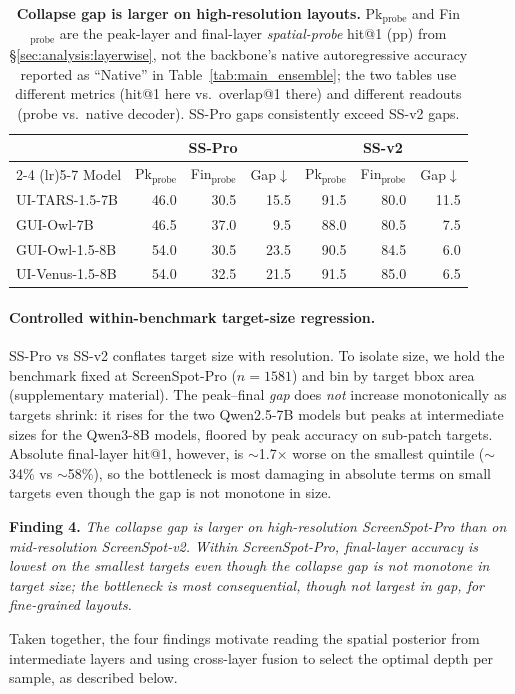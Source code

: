 \begin{table}[t]
\centering
\small
\setlength{\tabcolsep}{4pt}
\begin{tabular}{lrrr@{\hspace{0.8em}}rrr}
\toprule
& \multicolumn{3}{c}{SS-Pro} & \multicolumn{3}{c}{SS-v2} \\
\cmidrule(lr){2-4} \cmidrule(lr){5-7}
Model & Pk$_{\text{probe}}$ & Fin$_{\text{probe}}$ & Gap$\downarrow$ & Pk$_{\text{probe}}$ & Fin$_{\text{probe}}$ & Gap$\downarrow$ \\
\midrule
UI-TARS-1.5-7B & 46.0 & 30.5 & 15.5 & 91.5 & 80.0 & 11.5 \\
GUI-Owl-7B & 46.5 & 37.0 & 9.5 & 88.0 & 80.5 & 7.5 \\
GUI-Owl-1.5-8B & 54.0 & 30.5 & 23.5 & 90.5 & 84.5 & 6.0 \\
UI-Venus-1.5-8B & 54.0 & 32.5 & 21.5 & 91.5 & 85.0 & 6.5 \\
\bottomrule
\end{tabular}
\caption{
 \textbf{Collapse gap is larger on high-resolution layouts.}
 Pk$_{\text{probe}}$ and Fin$_{\text{probe}}$ are the peak-layer and final-layer \emph{spatial-probe} hit@1 (pp) from \S\ref{sec:analysis:layerwise}, not the backbone's native autoregressive accuracy reported as ``Native'' in Table~\ref{tab:main_ensemble}; the two tables use different metrics (hit@1 here vs.\ overlap@1 there) and different readouts (probe vs.\ native decoder).
 SS-Pro gaps consistently exceed SS-v2 gaps.
}
\label{tab:resolution_comparison}
\end{table}

\paragraph{Controlled within-benchmark target-size regression.}
SS-Pro vs SS-v2 conflates target size with resolution. To isolate size, we hold the benchmark fixed at ScreenSpot-Pro ($n{=}1581$) and bin by target bbox area (supplementary material). The peak--final \emph{gap} does \emph{not} increase monotonically as targets shrink: it rises for the two Qwen2.5-7B models but peaks at intermediate sizes for the Qwen3-8B models, floored by peak accuracy on sub-patch targets. Absolute final-layer hit@1, however, is $\sim$1.7$\times$ worse on the smallest quintile ($\sim$34\% vs $\sim$58\%), so the bottleneck is most damaging in absolute terms on small targets even though the gap is not monotone in size.

\begin{tcolorbox}[colback=gray!8, colframe=gray!40, boxrule=0.4pt, arc=2pt, left=4pt, right=4pt, top=3pt, bottom=3pt]
\textbf{Finding 4.}
\emph{The collapse gap is larger on high-resolution ScreenSpot-Pro than on mid-resolution ScreenSpot-v2. Within ScreenSpot-Pro, final-layer accuracy is lowest on the smallest targets even though the collapse gap is not monotone in target size; the bottleneck is most consequential, though not largest in gap, for fine-grained layouts.}
\end{tcolorbox}

Taken together, the four findings motivate reading the spatial posterior from intermediate layers and using cross-layer fusion to select the optimal depth per sample, as described below.
